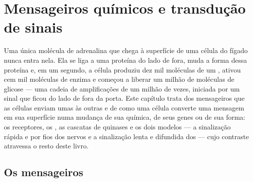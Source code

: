\chapter{Mensageiros químicos e transdução de sinais}\label{ch:b2:cell-signalling}

Uma única molécula de adrenalina que chega à superfície de uma célula
do fígado nunca entra nela. Ela se liga a uma proteína do lado de fora,
muda a forma dessa proteína e, em um segundo, a célula produziu dez mil
moléculas de um , ativou cem mil moléculas de enzima
e começou a liberar um milhão de moléculas de glicose --- uma cadeia de
amplificações de um milhão de vezes, iniciada por um sinal que ficou do
lado de fora da porta. Este capítulo trata dos mensageiros que as
células enviam umas às outras e de como uma célula converte uma
mensagem em sua superfície numa mudança de sua química, de seus genes
ou de sua forma: os receptores, os , as cascatas de
quinases e os dois modelos --- a sinalização rápida e por fios dos
nervos e a sinalização lenta e difundida dos  --- cujo
contraste atravessa o resto deste livro.

\section{Os mensageiros}

